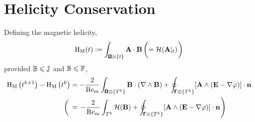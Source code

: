     \section*{Helicity Conservation}
        \begin{theorem*}
            Defining the magnetic helicity,
            \begin{equation}
                \rmH_{\rmM}(t)  :=  \int_{\bfOmega\otimes\{t\}}\bfA\cdot\bfB  \left(=  \calH(\bfA|_{t})\tall\right)
            \end{equation}
            provided $\mathbb{B}  \leqslant  \mathbb{J}$ and $\mathbb{B}  \leqslant  \mathbb{F}$,
            \begin{align}
                \rmH_{\rmM}\left(t^{k + 1}\right) - \rmH_{\rmM}\left(t^{k}\right)  &=  - \frac{2}{\rmRem}\int_{\bfOmega\otimes\left\{T^{k}\right\}}\bfB\cdot(\nabla\wedge\bfB) + \oint_{\bfGamma\otimes\left\{T^{k}\right\}}[\bfA\wedge(\bfE - \nabla\varphi)]\cdot\bfn  \\
                \left(\tall\right.&=  \left.- \frac{2}{\rmRem}\int_{T^{k}}\calH(\bfB) + \oint_{\bfGamma\otimes\left\{T^{k}\right\}}[\bfA\wedge(\bfE - \nabla\varphi)]\cdot\bfn\tall\right)
            \end{align}
        \end{theorem*}
